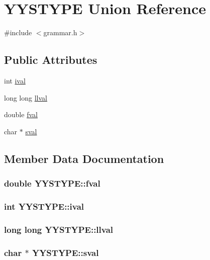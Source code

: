 \hypertarget{union_y_y_s_t_y_p_e}{
\section{YYSTYPE Union Reference}
\label{union_y_y_s_t_y_p_e}
}


{\ttfamily \#include $<$grammar.h$>$}

\subsection*{Public Attributes}
\begin{DoxyCompactItemize}
\item 
int \hyperlink{union_y_y_s_t_y_p_e_ae9d3f6cba410d8f367f34437acf8c9a2}{ival}
\item 
long long \hyperlink{union_y_y_s_t_y_p_e_a943fdbe79b7f976c66089ab5170dff54}{llval}
\item 
double \hyperlink{union_y_y_s_t_y_p_e_a31eb6403902c1580af29230db1ecc872}{fval}
\item 
char $\ast$ \hyperlink{union_y_y_s_t_y_p_e_a73a5074a72319891e5442106deeb667b}{sval}
\end{DoxyCompactItemize}


\subsection{Member Data Documentation}
\hypertarget{union_y_y_s_t_y_p_e_a31eb6403902c1580af29230db1ecc872}{
\subsubsection[{fval}]{\setlength{\rightskip}{0pt plus 5cm}double {\bf YYSTYPE::fval}}}
\label{union_y_y_s_t_y_p_e_a31eb6403902c1580af29230db1ecc872}
\hypertarget{union_y_y_s_t_y_p_e_ae9d3f6cba410d8f367f34437acf8c9a2}{
\subsubsection[{ival}]{\setlength{\rightskip}{0pt plus 5cm}int {\bf YYSTYPE::ival}}}
\label{union_y_y_s_t_y_p_e_ae9d3f6cba410d8f367f34437acf8c9a2}
\hypertarget{union_y_y_s_t_y_p_e_a943fdbe79b7f976c66089ab5170dff54}{
\subsubsection[{llval}]{\setlength{\rightskip}{0pt plus 5cm}long long {\bf YYSTYPE::llval}}}
\label{union_y_y_s_t_y_p_e_a943fdbe79b7f976c66089ab5170dff54}
\hypertarget{union_y_y_s_t_y_p_e_a73a5074a72319891e5442106deeb667b}{
\subsubsection[{sval}]{\setlength{\rightskip}{0pt plus 5cm}char $\ast$ {\bf YYSTYPE::sval}}}
\label{union_y_y_s_t_y_p_e_a73a5074a72319891e5442106deeb667b}


